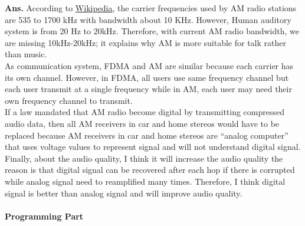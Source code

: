 \documentclass[12pt]{article}
\newenvironment{problem}[2][Problem]{\begin{trivlist}
\item[\hskip \labelsep {\bfseries #1}\hskip \labelsep {\bfseries #2.}]}{\end{trivlist}}
\begin{document}
\begin{problem}{3}
\end{problem}
\textbf{Ans.} According to \href{https://en.wikipedia.org/wiki/Broadcast_band}{Wikipedia}, the carrier frequencies used by AM radio stations are 535 to 1700 kHz with bandwidth about 10 KHz. However, Human auditory system is from 20 Hz to 20kHz. Therefore, with current AM radio bandwidth, we are missing 10kHz-20kHz; it explains why AM is more suitable for talk rather than music. \\
As communication system, FDMA and AM are similar because each carrier has its own channel. However, in FDMA, all users use same frequency channel but each user transmit at a single frequency while in AM, each user may need their own frequency channel to transmit. \\
If a  law  mandated  that  AM  radio  become  digital  by  transmitting compressed  audio  data, then all AM receivers in car and home stereos would have to be replaced because AM receivers in car and home stereos are ``analog computer'' that uses voltage values to represent signal and will not understand digital signal. \\ 
Finally, about the audio quality, I think it will increase the audio quality the reason is that digital signal can be recovered after each hop if there is corrupted while analog signal need to reamplified many times. Therefore, I think digital signal is better than analog signal and will improve audio quality.\\\\
\Large{\textbf{Programming Part}}
\normalsize
\begin{problem}{Bonus}
	
\end{problem}
\end{document}
